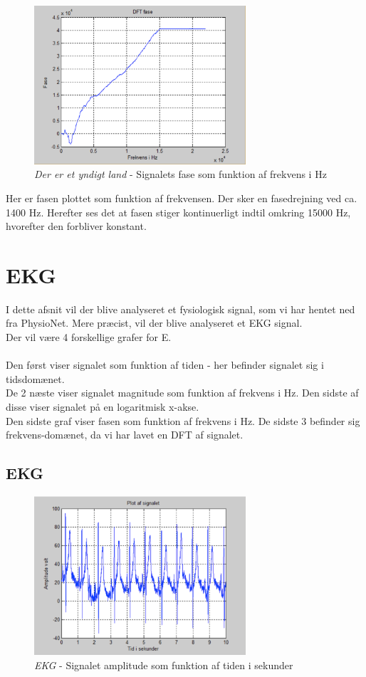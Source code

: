 \begin{figure}[H]
	\centering
	\includegraphics[width=0.7\textwidth]{Figurer/Nationalsang4}
	\caption{\textit{Der er et yndigt land} - Signalets fase som funktion af frekvens i Hz}
\end{figure}

Her er fasen plottet som funktion af frekvensen. Der sker en fasedrejning ved ca. 1400 Hz. Herefter ses det at fasen stiger kontinuerligt indtil omkring 15000 Hz, hvorefter den forbliver konstant.


\chapter{EKG}
I dette afsnit vil der blive analyseret et fysiologisk signal, som vi har hentet ned fra PhysioNet. Mere præcist, vil der blive analyseret et EKG signal. \\
Der vil være 4 forskellige grafer for E.\\ \\
Den først viser signalet som funktion af tiden - her befinder signalet sig i tidsdomænet. \\
De 2 næste viser signalet magnitude som funktion af frekvens i Hz. Den sidste af disse viser signalet på en logaritmisk x-akse. \\
Den sidste graf viser fasen som funktion af frekvens i Hz. De sidste 3 befinder sig frekvens-domænet, da vi har lavet en DFT af signalet.


\section{EKG}

\begin{figure}[H]
	\centering
	\includegraphics[width=0.7\textwidth]{Figurer/EKG}
	\caption{\textit{EKG} - Signalet amplitude som funktion af tiden i sekunder}
\end{figure}

